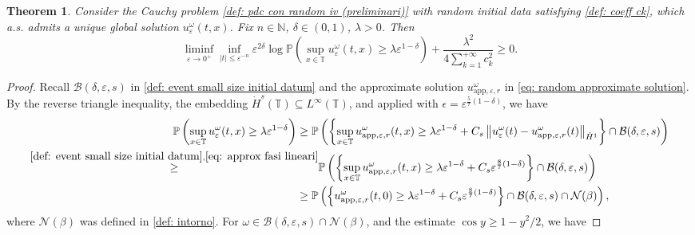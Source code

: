 \documentclass[a4paper,10pt,reqno]{article}
\theoremstyle{definition}
\theoremstyle{plain}
\newtheorem{theorem}[definition]{Theorem}
\theoremstyle{plain}
\theoremstyle{definition}
\theoremstyle{plain}
\theoremstyle{plain}
\theoremstyle{plain}
\theoremstyle{definition}
\theoremstyle{definition}
\newcommand{\norm}[1]{\left\lVert #1 \right\rVert}
\def \N{\mathbb N}
\def \P{{\mathbb P}}
\def \T{\mathbb{T}}
\def \B{\mathcal{B}}
\begin{document}
\begin{theorem} \label{thm: almost global ldp - lower bound}
Consider the Cauchy problem \eqref{def: pdc con random iv (preliminari)} with random initial data satisfying \eqref{def: coeff ck}, which a.s. admits a unique global solution $u_{\varepsilon}^{\omega}(t,x)$.
Fix $n \in \N$, $\delta \in (0,1)$, $\lambda > 0$. 
Then 
\begin{equation}\label{eq: almost global ldp - lower bound}
\liminf_{\varepsilon \to 0^{+}}  \inf_{|t|\leq \varepsilon^{-n}} \varepsilon^{2\delta} \log \P \left( \sup_{x \in \T} u_{\varepsilon}^{\omega}(t,x) \ge \lambda \varepsilon^{1-\delta} \right) + \frac{\lambda^2}{4 \sum_{k=1}^{+\infty} c_k^2} \geq 0.
\end{equation}
\end{theorem}
\begin{proof}
Recall $\B(\delta,\varepsilon,s)$ in \eqref{def: event small size initial datum} and the approximate solution $u_{\mathrm{app},\varepsilon,r}^{\omega}$ in \eqref{eq: random approximate solution}.
By the reverse triangle inequality, the embedding $\dot{H}^s(\T) \subseteq L^{\infty}(\T)$, and  applied with $\epsilon=\varepsilon^{\frac57 (1-\delta)}$, we have
\begin{align}
\P \left( \sup_{x \in \T} u_{\varepsilon}^{\omega}(t,x) \ge \lambda \varepsilon^{1-\delta} \right) \ge \P & \left( \left \{ \sup_{x \in \T} u_{\mathrm{app},\varepsilon,r}^{\omega}(t,x) \ge \lambda \varepsilon^{1-\delta} + C_s \norm{u_{\varepsilon}^{\omega}(t)-u_{\mathrm{app},\varepsilon,r}^{\omega}(t)}_{\dot{H}^1} \right \} \cap \B(\delta,\varepsilon,s) \right) \nonumber \\
\stackrel{\eqref{def: event small size initial datum},\eqref{eq: approx fasi lineari}}{\ge} & \P  \left( \left \{ \sup_{x \in \T} u_{\mathrm{app},\varepsilon,r}^{\omega}(t,x) \ge \lambda \varepsilon^{1-\delta} + C_s \varepsilon^{\frac{8}{7}(1-\delta)} \right \} \cap \B(\delta,\varepsilon,s) \right ) \label{for dispersive focusing} \\
\ge \P & \left( \left \{ u_{\mathrm{app},\varepsilon,r}^{\omega}(t,0) \ge \lambda \varepsilon^{1-\delta} + C_s \varepsilon^{\frac{8}{7}(1-\delta)} \right \} \cap \B(\delta,\varepsilon,s) \cap \mathcal{N}(\beta)  \right ), \label{third inequality}
\end{align}
where $\mathcal{N}(\beta)$ was defined in \eqref{def: intorno}. For $\omega \in \B(\delta,\varepsilon,s) \cap \mathcal{N}(\beta)$, and the estimate $\cos y\geq 1-y^2/2$, we have

\end{proof}
\end{document}
